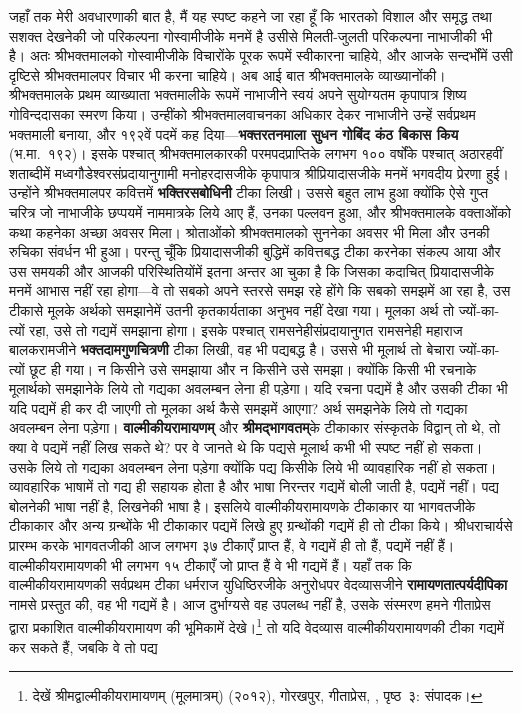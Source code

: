 \begin{sloppypar}\justifying{}
जहाँ तक मेरी अवधारणाकी बात है, मैं यह स्पष्ट कहने जा रहा हूँ कि भारतको विशाल और समृद्ध तथा सशक्त देखनेकी जो परिकल्पना गोस्वामीजीके मनमें है उसीसे मिलती-जुलती परिकल्पना नाभाजीकी भी है। अतः श्रीभक्तमालको गोस्वामीजीके विचारोंके पूरक रूपमें स्वीकारना चाहिये, और आजके सन्दर्भोंमें उसी दृष्टिसे श्रीभक्तमालपर विचार भी करना चाहिये।
अब आई बात श्रीभक्तमालके व्याख्यानोंकी। श्रीभक्तमालके प्रथम व्याख्याता भक्तमालीके रूपमें नाभाजीने स्वयं अपने सुयोग्यतम कृपापात्र शिष्य गोविन्ददासका स्मरण किया। उन्हींको श्रीभक्तमाल\-वाचनका अधिकार देकर नाभाजीने उन्हें सर्वप्रथम भक्तमाली बनाया, और १९२वें पदमें कह दिया—\textbf{भक्तरतनमाला सुधन गोबिंद कंठ बिकास किय} (भ.मा.~१९२)। इसके पश्चात् श्रीभक्तमालकारकी परमपद\-प्राप्तिके लगभग १०० वर्षोंके पश्चात् अठारहवीं शताब्दीमें मध्वगौडेश्वर\-संप्रदायानुगामी मनोहरदासजीके कृपापात्र श्रीप्रियादासजीके मनमें भगवदीय प्रेरणा हुई। उन्होंने श्रीभक्तमालपर कवित्तमें \textbf{भक्तिरसबोधिनी} टीका लिखी। उससे बहुत लाभ हुआ क्योंकि ऐसे गुप्त चरित्र जो नाभाजीके छप्पयमें नाममात्रके लिये आए हैं, उनका पल्लवन हुआ, और श्रीभक्तमालके वक्ताओंको कथा कहनेका अच्छा अवसर मिला। श्रोताओंको श्रीभक्तमालको सुननेका अवसर भी मिला और उनकी रुचिका संवर्धन भी हुआ। परन्तु चूँकि प्रियादासजीकी बुद्धिमें कवित्तबद्ध टीका करनेका संकल्प आया और उस समयकी और आजकी परिस्थितियोंमें इतना अन्तर आ चुका है कि जिसका कदाचित् प्रियादासजीके मनमें आभास नहीं रहा होगा—वे तो सबको अपने स्तरसे समझ रहे होंगे कि सबको समझमें आ रहा है, उस टीकासे मूलके अर्थको समझानेमें उतनी कृतकार्यताका अनुभव नहीं देखा गया। मूलका अर्थ तो ज्यों-का-त्यों रहा, उसे तो गद्यमें समझाना होगा। इसके पश्चात् रामसनेही\-संप्रदायानुगत रामसनेही महाराज बालकरामजीने \textbf{भक्तदामगुणचित्रणी} टीका लिखी, वह भी पद्यबद्ध है। उससे भी मूलार्थ तो बेचारा ज्यों-का-त्यों छूट ही गया। न किसीने उसे समझाया और न किसीने उसे समझा। क्योंकि किसी भी रचनाके मूलार्थको समझानेके लिये तो गद्यका अवलम्बन लेना ही पड़ेगा। यदि रचना पद्यमें है और उसकी टीका भी यदि पद्यमें ही कर दी जाएगी तो मूलका अर्थ कैसे समझमें आएगा? अर्थ समझनेके लिये तो गद्यका अवलम्बन लेना पड़ेगा। \textbf{वाल्मीकीय\-रामायणम्} और \textbf{श्रीमद्भागवतम्}के टीकाकार संस्कृतके विद्वान् तो थे, तो क्या वे पद्यमें नहीं लिख सकते थे? पर वे जानते थे कि पद्यसे मूलार्थ कभी भी स्पष्ट नहीं हो सकता। उसके लिये तो गद्यका अवलम्बन लेना पड़ेगा क्योंकि पद्य किसीके लिये भी व्यावहारिक नहीं हो सकता। व्यावहारिक भाषामें तो गद्य ही सहायक होता है और भाषा निरन्तर गद्यमें बोली जाती है, पद्यमें नहीं। पद्य बोलनेकी भाषा नहीं है, लिखनेकी भाषा है। इसलिये वाल्मीकीय\-रामायणके टीकाकार या भागवतजीके टीकाकार और अन्य ग्रन्थोंके भी टीकाकार पद्यमें लिखे हुए ग्रन्थोंकी गद्यमें ही तो टीका किये। श्रीधराचार्यसे प्रारम्भ करके भागवतजीकी आज लगभग ३७ टीकाएँ प्राप्त हैं, वे गद्यमें ही तो हैं, पद्यमें नहीं हैं। वाल्मीकीय\-रामायणकी भी लगभग १५ टीकाएँ जो प्राप्त हैं वे भी गद्यमें हैं। यहाँ तक कि वाल्मीकीय\-रामायणकी सर्वप्रथम टीका धर्मराज युधिष्ठिरजीके अनुरोधपर वेदव्यासजीने \textbf{रामायण\-तात्पर्य\-दीपिका} नामसे प्रस्तुत की, वह भी गद्यमें है। आज दुर्भाग्यसे वह उपलब्ध नहीं है, उसके संस्मरण हमने गीताप्रेस द्वारा प्रकाशित वाल्मीकीय\-रामायण की भूमिकामें देखे।\footnote{देखें श्रीमद्वाल्मीकीयरामायणम् (मूलमात्रम्) (२०१२), गोरखपुर, गीताप्रेस, {}, पृष्ठ~३: संपादक।} तो यदि वेदव्यास वाल्मीकीय\-रामायणकी टीका गद्यमें कर सकते हैं, जबकि वे तो पद्य 
\end{sloppypar}
